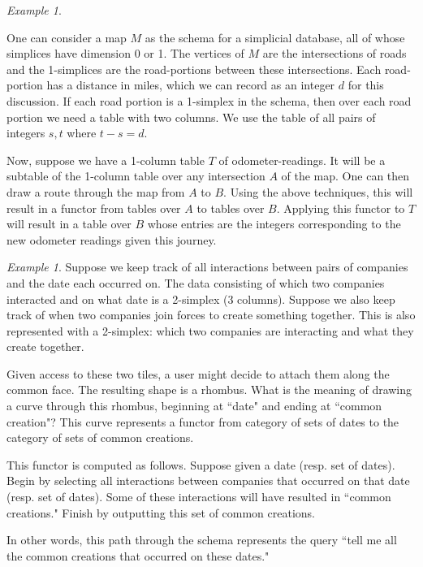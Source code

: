 \documentclass{amsart}
\theoremstyle{remark}
\newtheorem{example}[theorem]{Example}
\theoremstyle{definition}
\begin{document}
\begin{example}\label{ex:odometer}

One can consider a map $M$ as the schema for a simplicial database, all of whose simplices have dimension 0 or 1.  The vertices of $M$ are the intersections of roads and the 1-simplices are the road-portions between these intersections.  Each road-portion has a distance in miles, which we can record as an integer $d$ for this discussion.  If each road portion is a 1-simplex in the schema, then over each road portion we need a table with two columns.  We use the table of all pairs of integers $s,t$ where $t-s=d$. 

Now, suppose we have a 1-column table $T$ of odometer-readings.  It will be a subtable of the 1-column table over any intersection $A$ of the map.   One can then draw a route through the map from $A$ to $B$.  Using the above techniques, this will result in a functor from tables over $A$ to tables over $B$.  Applying this functor to $T$ will result in a table over $B$ whose entries are the integers corresponding to the new odometer readings given this journey.  

\end{example}

\begin{example}

Suppose we keep track of all interactions between pairs of companies and the date each occurred on.  The data consisting of which two companies interacted and on what date is a 2-simplex (3 columns).  Suppose we also keep track of when two companies join forces to create something together.  This is also represented with a 2-simplex: which two companies are interacting and what they create together.  

Given access to these two tiles, a user might decide to attach them along the common face.  The resulting shape is a rhombus.  What is the meaning of drawing a curve through this rhombus, beginning at ``date" and ending at ``common creation"?  This curve represents a functor from category of sets of dates to the category of sets of common creations.  

This functor is computed as follows.  Suppose given a date (resp. set of dates).  Begin by selecting all interactions between companies that occurred on that date (resp. set of dates).  Some of these interactions will have resulted in ``common creations."  Finish by outputting this set of common creations.

In other words, this path through the schema represents the query ``tell me all the common creations that occurred on these dates."  

\end{example}
\end{document}
